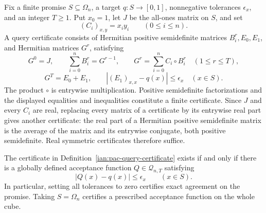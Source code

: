 \begin{definition}
\label{ian:pac-query-certificate}
Fix a finite promise \(S\subseteq\Omega_n\), a target
\(q:S\to[0,1]\), nonnegative tolerances \(\epsilon_x\), and an
integer \(T\ge1\).
Put \(x_0=1\), let \(J\) be the all-ones matrix on \(S\), and set
\[
 (C_i)_{x,y}=x_i y_i\qquad(0\le i\le n).
\]
A query certificate consists of Hermitian positive semidefinite matrices
\(B_i^r,E_0,E_1\), and Hermitian matrices \(G^r\), satisfying
\[
 G^0=J,
 \qquad
 \sum_{i=0}^n B_i^r=G^{r-1},
 \qquad
 G^r=\sum_{i=0}^n C_i\circ B_i^r
 \quad(1\le r\le T),
 \tag{32.8}\label{ian:pac-query-sdp}
\]
\[
 G^T=E_0+E_1,
 \qquad
 |(E_1)_{x,x}-q(x)|\le\epsilon_x
 \quad(x\in S).
 \tag{32.9}
\]
The product \(\circ\) is entrywise multiplication.
Positive semidefinite factorizations and the displayed equalities
and inequalities constitute a finite certificate.
Since \(J\) and every \(C_i\) are real, replacing every matrix of a certificate by its entrywise real part gives another certificate: the real part of a Hermitian positive semidefinite matrix is the average of the matrix and its entrywise conjugate, both positive semidefinite. Real symmetric certificates therefore suffice.
\end{definition}

\begin{theorem}
\label{ian:pac-query-synthesis}
The certificate in Definition~\ref{ian:pac-query-certificate}
exists if and only if there is a globally defined acceptance
function \(Q\in\mathcal Q_{n,T}\) satisfying
\[
 |Q(x)-q(x)|\le\epsilon_x\qquad(x\in S).
\]
In particular, setting all tolerances to zero certifies exact
agreement on the promise. Taking \(S=\Omega_n\) certifies a
prescribed acceptance function on the whole cube.
\end{theorem}

